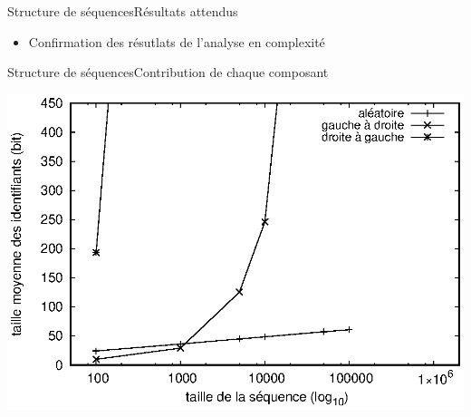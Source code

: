 \begin{frame}{Structure de séquences}{Résultats attendus}
  
  \begin{itemize}
  \item Confirmation des résutlats de l'analyse en complexité
  \end{itemize}

\end{frame}



\begin{frame}{Structure de séquences}{Contribution de chaque composant}
  
  \hspace{-1cm}
  \begin{minipage}{0.45\textwidth}
    \includegraphics[width=1.25\textwidth]{img/replication/logoot.eps}
  \end{minipage}
  \hspace{1.5cm}
  \begin{minipage}{0.45\textwidth}
  \end{minipage}
  

\end{frame}
